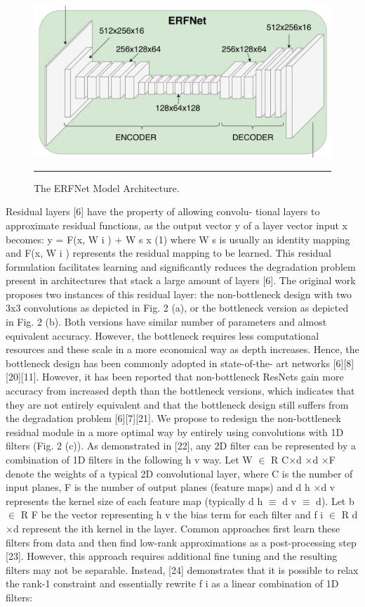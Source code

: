 \begin{figure}[htbp]
	\centering
		\includegraphics[scale=0.4]{Figures/erfnet.png}
		\rule{35em}{0.5pt}
	\caption[The ERFNet Model Architecture]{The ERFNet Model Architecture.}
	\label{fig:The ERFNet Model Architecture}
\end{figure}
Residual layers [6] have the property of allowing convolu-
tional layers to approximate residual functions, as the output
vector y of a layer vector input x becomes:
y = F(x, {W i }) + W s x
(1)
where W s is usually an identity mapping and F(x, {W i })
represents the residual mapping to be learned. This residual
formulation facilitates learning and significantly reduces the
degradation problem present in architectures that stack a large
amount of layers [6]. The original work proposes two instances
of this residual layer: the non-bottleneck design with two 3x3
convolutions as depicted in Fig. 2 (a), or the bottleneck version
as depicted in Fig. 2 (b). Both versions have similar number
of parameters and almost equivalent accuracy. However, the
bottleneck requires less computational resources and these
scale in a more economical way as depth increases. Hence, the
bottleneck design has been commonly adopted in state-of-the-
art networks [6][8][20][11]. However, it has been reported that
non-bottleneck ResNets gain more accuracy from increased
depth than the bottleneck versions, which indicates that they
are not entirely equivalent and that the bottleneck design still
suffers from the degradation problem [6][7][21].
We propose to redesign the non-bottleneck residual module
in a more optimal way by entirely using convolutions with 1D
filters (Fig. 2 (c)). As demonstrated in [22], any 2D filter can
be represented by a combination of 1D filters in the following
h
v
way. Let W $\in$ R C×d ×d ×F denote the weights of a typical
2D convolutional layer, where C is the number of input
planes, F is the number of output planes (feature maps) and
d h ×d v represents the kernel size of each feature map (typically
d h $\equiv$ d v $\equiv$ d). Let b $\in$ R F be the vector representing
h
v
the bias term for each filter and f i $\in$ R d ×d represent the
ith kernel in the layer. Common approaches first learn these
filters from data and then find low-rank approximations as
a post-processing step [23]. However, this approach requires
additional fine tuning and the resulting filters may not be
separable. Instead, [24] demonstrates that it is possible to relax
the rank-1 constraint and essentially rewrite f i as a linear
combination of 1D filters:

